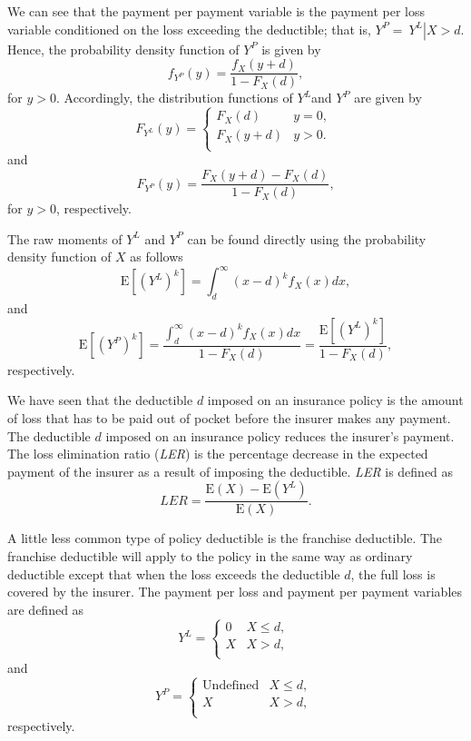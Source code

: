 \documentclass[]{book}
\theoremstyle{definition}
\theoremstyle{definition}
\theoremstyle{definition}
\theoremstyle{remark}
\begin{document}
We can see that the payment per payment variable is the payment per loss
variable conditioned on the loss exceeding the deductible; that is,
\(Y^{P} = \left. \ Y^{L} \right|X > d\). Hence, the probability density
function of \(Y^{P}\) is given by
\[f_{Y^{P}}\left( y \right) = \frac{f_{X}\left( y + d \right)}{1 - F_{X}\left( d \right)},\]
for \(y > 0\). Accordingly, the distribution functions of \(Y^{L}\)and
\(Y^{P}\) are given by
\[F_{Y^{L}}\left( y \right) = \left\{ \begin{matrix}
F_{X}\left( d \right) & y = 0, \\
F_{X}\left( y + d \right) & y > 0. \\
\end{matrix} \right.\ \] and
\[F_{Y^{P}}\left( y \right) = \frac{F_{X}\left( y + d \right) - F_{X}\left( d \right)}{1 - F_{X}\left( d \right)},\]
for \(y > 0\), respectively.

The raw moments of \(Y^{L}\) and \(Y^{P}\) can be found directly using
the probability density function of \(X\) as follows
\[\mathrm{E}\left\lbrack \left( Y^{L} \right)^{k} \right\rbrack = \int_{d}^{\infty}\left( x - d \right)^{k}f_{X}\left( x \right)dx ,\]
and
\[\mathrm{E}\left\lbrack \left( Y^{P} \right)^{k} \right\rbrack = \frac{\int_{d}^{\infty}\left( x - d \right)^{k}f_{X}\left( x \right) dx }{{1 - F}_{X}\left( d \right)} = \frac{\mathrm{E}\left\lbrack \left( Y^{L} \right)^{k} \right\rbrack}{{1 - F}_{X}\left( d \right)},\]
respectively.

We have seen that the deductible \(d\) imposed on an insurance policy is
the amount of loss that has to be paid out of pocket before the insurer
makes any payment. The deductible \(d\) imposed on an insurance policy
reduces the insurer's payment. The loss elimination ratio (\emph{LER})
is the percentage decrease in the expected payment of the insurer as a
result of imposing the deductible. \emph{LER} is defined as
\[LER = \frac{\mathrm{E}\left( X \right) - \mathrm{E}\left( Y^{L} \right)}{\mathrm{E}\left( X \right)}.\]

A little less common type of policy deductible is the franchise
deductible. The franchise deductible will apply to the policy in the
same way as ordinary deductible except that when the loss exceeds the
deductible \(d\), the full loss is covered by the insurer. The payment
per loss and payment per payment variables are defined as
\[Y^{L} = \left\{ \begin{matrix}
0 & X \leq d, \\
X & X > d, \\
\end{matrix} \right.\ \] and \[Y^{P} = \left\{ \begin{matrix}
\text{Undefined} & X \leq d, \\
X & X > d, \\
\end{matrix} \right.\ \] respectively.
\end{document}

